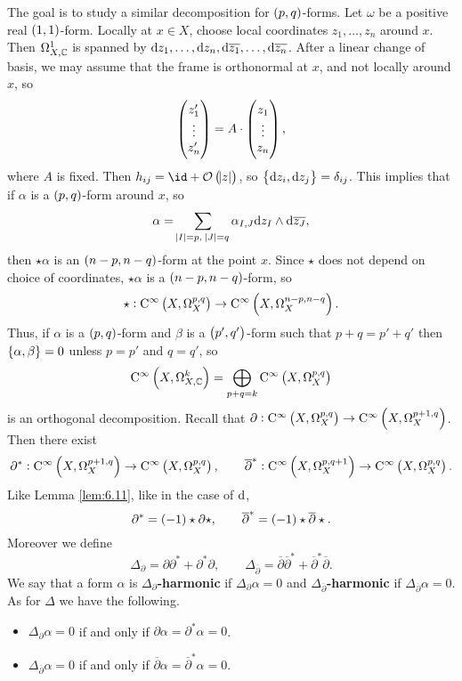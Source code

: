 The goal is to study a similar decomposition for $ \br{p, q} $-forms. Let $ \omega $ be a positive real $ \br{1, 1} $-form. Locally at $ x \in X $, choose local coordinates $ z_1, \dots, z_n $ around $ x $. Then $ \Omega_{X, \mathbb{C}}^1 $ is spanned by $ \mathrm{d} z_1, \dots, \mathrm{d} z_n, \mathrm{d}\overline{z_1}, \dots, \mathrm{d}\overline{z_n} $. After a linear change of basis, we may assume that the frame is orthonormal at $ x $, and not locally around $ x $, so
$$ \begin{pmatrix} z_1' \\ \vdots \\ z_n' \end{pmatrix} = A \cdot \begin{pmatrix} z_1 \\ \vdots \\ z_n \end{pmatrix}, $$
where $ A $ is fixed. Then $ h_{ij} = \id + \OOO\br{\abs{z}} $, so $ \cbr{\d z_i, \d z_j} = \delta_{ij} $. This implies that if $ \alpha $ is a $ \br{p, q} $-form around $ x $, so
$$ \alpha = \sum_{\abs{I} = p, \ \abs{J} = q} \alpha_{I, J}\mathrm{d} z_I \wedge \mathrm{d}\overline{z_J}, $$
then $ \star\alpha $ is an $ \br{n - p, n - q} $-form at the point $ x $. Since $ \star $ does not depend on choice of coordinates, $ \star\alpha $ is a $ \br{n - p, n - q} $-form, so
$$ \star : \C^\infty\br{X, \Omega_X^{p, q}} \to \C^\infty\br{X, \Omega_X^{n - p, n - q}}. $$
Thus, if $ \alpha $ is a $ \br{p, q} $-form and $ \beta $ is a $ \br{p', q'} $-form such that $ p + q = p' + q' $ then $ \cbr{\alpha, \beta} = 0 $ unless $ p = p' $ and $ q = q' $, so
$$ \C^\infty\br{X, \Omega_{X, \CC}^k} = \bigoplus_{p + q = k} \C^\infty\br{X, \Omega_X^{p, q}} $$
is an orthogonal decomposition. Recall that $ \partial : \C^\infty\br{X, \Omega_X^{p, q}} \to \C^\infty\br{X, \Omega_X^{p + 1, q}} $. Then there exist
$$ \partial^* : \C^\infty\br{X, \Omega_X^{p + 1, q}} \to \C^\infty\br{X, \Omega_X^{p, q}}, \qquad \overline{\partial}^* : \C^\infty\br{X, \Omega_X^{p, q + 1}} \to \C^\infty\br{X, \Omega_X^{p, q}}. $$
Like Lemma \ref{lem:6.11}, like in the case of $ \mathrm{d} $,
$$ \partial^* = \br{-1}\star\partial\star, \qquad \overline{\partial}^* = \br{-1}\star\overline{\partial}\star. $$
Moreover we define
$$ \Delta_\partial = \partial\partial^* + \partial^*\partial, \qquad \Delta_{\overline{\partial}} = \overline{\partial}\overline{\partial}^* + \overline{\partial}^*\overline{\partial}. $$
We say that a form $ \alpha $ is \textbf{$ \Delta_\partial $-harmonic} if $ \Delta_\partial\alpha = 0 $ and \textbf{$ \Delta_{\overline{\partial}} $-harmonic} if $ \Delta_{\overline{\partial}}\alpha = 0 $. As for $ \Delta $ we have the following.

\pagebreak

\begin{lemma}
\label{lem:6.20}
\hfill
\begin{itemize}
\item $ \Delta_\partial\alpha = 0 $ if and only if $ \partial\alpha = \partial^*\alpha = 0 $.
\item $ \Delta_{\overline{\partial}}\alpha = 0 $ if and only if $ \overline{\partial}\alpha = \overline{\partial}^*\alpha = 0 $.
\end{itemize}
\end{lemma}

